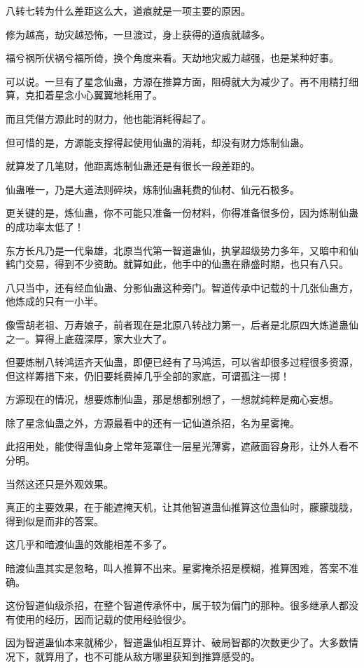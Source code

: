 \begin{this_body}
八转七转为什么差距这么大，道痕就是一项主要的原因。

修为越高，劫灾越恐怖，一旦渡过，身上获得的道痕就越多。

福兮祸所伏祸兮福所倚，换个角度来看。天劫地灾威力越强，也是某种好事。

可以说。一旦有了星念仙蛊，方源在推算方面，阻碍就大为减少了。再不用精打细算，克扣着星念小心翼翼地耗用了。

而且凭借方源此时的财力，他也能消耗得起了。

但可惜的是，方源能支撑得起使用仙蛊的消耗，却没有财力炼制仙蛊。

就算发了几笔财，他距离炼制仙蛊还是有很长一段差距的。

仙蛊唯一，乃是大道法则碎块，炼制仙蛊耗费的仙材、仙元石极多。

更关键的是，炼仙蛊，你不可能只准备一份材料，你得准备很多份，因为炼制仙蛊的成功率太低了！

东方长凡乃是一代枭雄，北原当代第一智道蛊仙，执掌超级势力多年，又暗中和仙鹤门交易，得到不少资助。就算如此，他手中的仙蛊在鼎盛时期，也只有八只。

八只当中，还有经血仙蛊、分影仙蛊这种旁门。智道传承中记载的十几张仙蛊方，他炼成的只有一小半。

像雪胡老祖、万寿娘子，前者现在是北原八转战力第一，后者是北原四大炼道蛊仙之一。算得上底蕴深厚，家大业大了。

但要炼制八转鸿运齐天仙蛊，即便已经有了马鸿运，可以省却很多过程很多资源，但这样筹措下来，仍旧要耗费掉几乎全部的家底，可谓孤注一掷！

方源现在的情况，想要炼制仙蛊，那是想都别想了，一想就纯粹是痴心妄想。

除了星念仙蛊之外，方源最看中的还有一记仙道杀招，名为星雾掩。

此招用处，能使得蛊仙身上常年笼罩住一层星光薄雾，遮蔽面容身形，让外人看不分明。

当然这还只是外观效果。

真正的主要效果，在于能遮掩天机，让其他智道蛊仙推算这位蛊仙时，朦朦胧胧，得到似是而非的答案。

这几乎和暗渡仙蛊的效能相差不多了。

暗渡仙蛊其实是忽略，叫人推算不出来。星雾掩杀招是模糊，推算困难，答案不准确。

这份智道仙级杀招，在整个智道传承怀中，属于较为偏门的那种。很多继承人都没有使用的经历，因而记载的使用经验很少。

因为智道蛊仙本来就稀少，智道蛊仙相互算计、破局智都的次数更少了。大多数情况下，就算用了，也不可能从敌方哪里获知到推算感受的。


\end{this_body}
